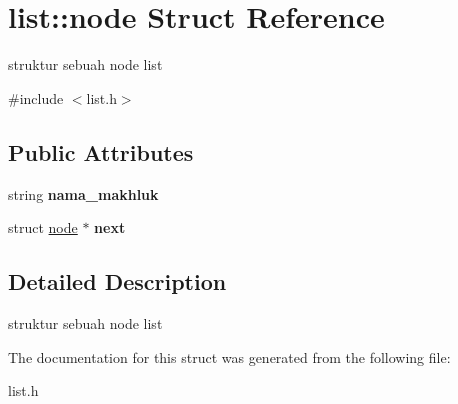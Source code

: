 \hypertarget{structlist_1_1node}{}\section{list\+:\+:node Struct Reference}
\label{structlist_1_1node}


struktur sebuah node list  




{\ttfamily \#include $<$list.\+h$>$}

\subsection*{Public Attributes}
\begin{DoxyCompactItemize}
\item 
string {\bfseries nama\+\_\+makhluk}\hypertarget{structlist_1_1node_a06f92cd10b0f1273f38dd9d69796688f}{}\label{structlist_1_1node_a06f92cd10b0f1273f38dd9d69796688f}

\item 
struct \hyperlink{structlist_1_1node}{node} $\ast$ {\bfseries next}\hypertarget{structlist_1_1node_a3fef0f498c6c1cf8e8cc9cf92edcc664}{}\label{structlist_1_1node_a3fef0f498c6c1cf8e8cc9cf92edcc664}

\end{DoxyCompactItemize}


\subsection{Detailed Description}
struktur sebuah node list 

The documentation for this struct was generated from the following file\+:\begin{DoxyCompactItemize}
\item 
list.\+h\end{DoxyCompactItemize}
